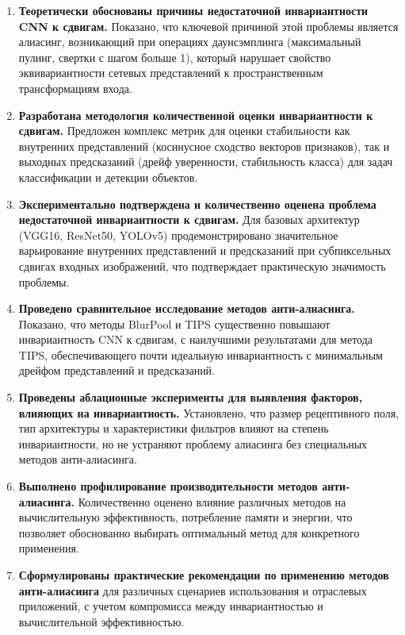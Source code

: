 \begin{enumerate}
    \item \textbf{Теоретически обоснованы причины недостаточной инвариантности CNN к сдвигам.} Показано, что ключевой причиной этой проблемы является алиасинг, возникающий при операциях даунсэмплинга (максимальный пулинг, свертки с шагом больше 1), который нарушает свойство эквивариантности сетевых представлений к пространственным трансформациям входа.
    
    \item \textbf{Разработана методология количественной оценки инвариантности к сдвигам.} Предложен комплекс метрик для оценки стабильности как внутренних представлений (косинусное сходство векторов признаков), так и выходных предсказаний (дрейф уверенности, стабильность класса) для задач классификации и детекции объектов.
    
    \item \textbf{Экспериментально подтверждена и количественно оценена проблема недостаточной инвариантности к сдвигам.} Для базовых архитектур (VGG16, ResNet50, YOLOv5) продемонстрировано значительное варьирование внутренних представлений и предсказаний при субпиксельных сдвигах входных изображений, что подтверждает практическую значимость проблемы.
    
    \item \textbf{Проведено сравнительное исследование методов анти-алиасинга.} Показано, что методы BlurPool и TIPS существенно повышают инвариантность CNN к сдвигам, с наилучшими результатами для метода TIPS, обеспечивающего почти идеальную инвариантность с минимальным дрейфом представлений и предсказаний.
    
    \item \textbf{Проведены аблационные эксперименты для выявления факторов, влияющих на инвариантность.} Установлено, что размер рецептивного поля, тип архитектуры и характеристики фильтров влияют на степень инвариантности, но не устраняют проблему алиасинга без специальных методов анти-алиасинга.
    
    \item \textbf{Выполнено профилирование производительности методов анти-алиасинга.} Количественно оценено влияние различных методов на вычислительную эффективность, потребление памяти и энергии, что позволяет обоснованно выбирать оптимальный метод для конкретного применения.
    
    \item \textbf{Сформулированы практические рекомендации по применению методов анти-алиасинга} для различных сценариев использования и отраслевых приложений, с учетом компромисса между инвариантностью и вычислительной эффективностью.
\end{enumerate}

